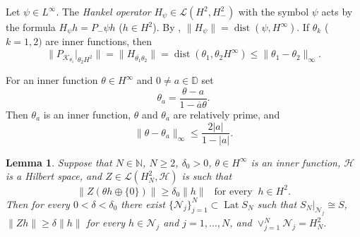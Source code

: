\documentclass[a4paper,oneside,11pt]{amsart}
\numberwithin{equation}{section}
\theoremstyle{plain}
\newtheorem{lemma}[theorem]{Lemma}
\theoremstyle{definition}
\begin{document}
Let $\psi\in L^\infty$. The \emph{Hankel operator} $H_\psi\in\mathcal L(H^2,H^2_-)$ with the symbol $\psi$ acts by the formula 
$H_\psi h=P_-\psi h$ ($h\in H^2$). By {\cite[formula (1.1.9)]{peller}}, $\|H_\psi\|=\operatorname{dist}(\psi, H^\infty)$.
If $\theta_k$ ($k=1,2)$ are inner functions, then 
\begin{equation}\label{hankel}\|P_{\mathcal K_{\theta_1}}|_{\theta_2 H^2}\|=\|H_{\overline{\theta_1}\theta_2}\|=
\operatorname{dist}(\theta_1,\theta_2 H^\infty)\leq\|\theta_1-\theta_2\|_\infty.
\end{equation}

For an inner function $\theta\in H^\infty$ and $0\neq a\in\mathbb D$ set 
\begin{equation}\label{thetaa} \theta_a=\frac{\theta-a}{1-\overline a\theta}.
\end{equation}
Then $\theta_a$ is an inner function, $\theta$ and $\theta_a$ are relatively prime, and 
\begin{equation}\label{estthetaa} \|\theta-\theta_a\|_\infty\leq\frac{2|a|}{1-|a|}. 
\end{equation}

\begin{lemma}\label{lem27} Suppose that 
$N\in\mathbb N$, $N\geq 2$, 
 $\delta_0>0$, $\theta\in H^\infty$ is an inner function, $\mathcal H$ is a Hilbert space, and 
$Z\in\mathcal L(H^2_N, \mathcal H)$ is such that 
\begin{equation*}\|Z(\theta h\oplus\{0\})\|\geq\delta_0\|h\| \ \ \text{  for every } \ h\in H^2.\end{equation*} 
Then for every $0<\delta<\delta_0$ there exist $\{\mathcal N_j\}_{j=1}^N\subset\operatorname{Lat}S_N$ such that 
$S_N|_{\mathcal N_j}\cong S$, 
$\|Zh\|\geq\delta\|h\|$ for every $h\in \mathcal N_j$ and $j=1,\ldots, N$, and $\vee_{j=1}^N\mathcal N_j=H^2_N$.
\end{lemma}
\end{document}
